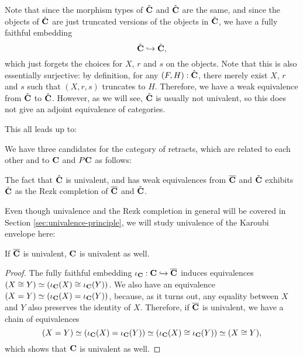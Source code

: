 \begin{remark}
  Note that since the morphism types of $ \tilde {\mathbf{C}} $ and $ \hat {\mathbf{C}} $ are the same, and since the objects of $ \hat {\mathbf{C}} $ are just truncated versions of the objects in $ \tilde {\mathbf{C}} $, we have a fully faithful embedding
  \[ \tilde {\mathbf{C}} \hookrightarrow \hat {\mathbf{C}}, \]
  which just forgets the choices for $ X $, $ r $ and $ s $ on the objects. Note that this is also essentially surjective: by definition, for any $ (F, H) : \hat {\mathbf{C}} $, there merely exist $ X $, $ r $ and $ s $ such that $ (X, r, s) $ truncates to $ H $.
  Therefore, we have a weak equivalence from $ \tilde {\mathbf{C}} $ to $ \hat {\mathbf{C}} $. However, as we will see, $ \tilde {\mathbf{C}} $ is usually not univalent, so this does not give an adjoint equivalence of categories.
\end{remark}

This all leads up to:
\begin{corollary}\label{cor:karoubi-candidates}
  We have three candidates for the category of retracts, which are related to each other and to $ \mathbf{C} $ and $ P\mathbf{C} $ as follows:
  \begin{center}
  \end{center}
  The fact that $ \hat {\mathbf{C}} $ is univalent, and has weak equivalences from $ \overline {\mathbf{C}} $ and $ \tilde {\mathbf{C}} $ exhibits $ \hat {\mathbf{C}} $ as the Rezk completion of $ \overline {\mathbf{C}} $ and $ \tilde {\mathbf{C}} $.
\end{corollary}

Even though univalence and the Rezk completion in general will be covered in Section \ref{sec:univalence-principle}, we will study univalence of the Karoubi envelope here:

\begin{lemma}
  If $ \overline {\mathbf{C}} $ is univalent, $ \mathbf{C} $ is univalent as well.
\end{lemma}
\begin{proof}
  The fully faithful embedding $ \iota_{\mathbf{C}} : \mathbf{C} \hookrightarrow \overline {\mathbf{C}} $ induces equivalences $ (X \cong Y) \simeq (\iota_{\mathbf{C}}(X) \cong \iota_{\mathbf{C}}(Y)) $. We also have an equivalence $ (X = Y) \simeq (\iota_{\mathbf{C}}(X) = \iota_{\mathbf{C}}(Y)) $, because, as it turns out, any equality between $ X $ and $ Y $ also preserves the identity of $ X $. Therefore, if $ \overline {\mathbf{C}} $ is univalent, we have a chain of equivalences
  \[ (X = Y) \simeq (\iota_{\mathbf{C}}(X) = \iota_{\mathbf{C}}(Y)) \simeq (\iota_{\mathbf{C}}(X) \cong \iota_{\mathbf{C}}(Y)) \simeq (X \cong Y), \]
  which shows that $ \mathbf{C} $ is univalent as well.
\end{proof}

